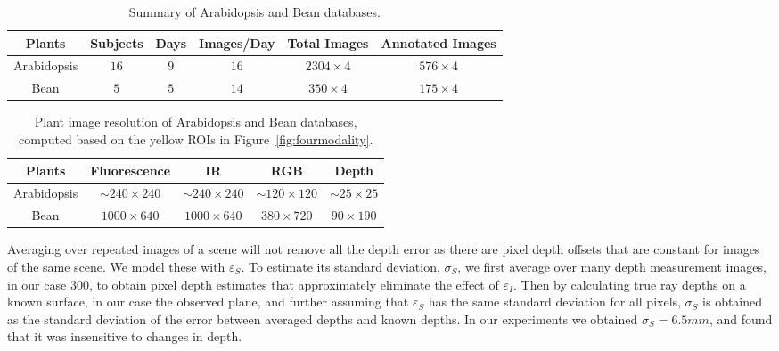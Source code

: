 \begin{table*}[t!]
\begin{center}
\caption{Summary of Arabidopsis and Bean databases.}
\label{tab:stat}
\begin{tabular}{c|c|c|c|c|c}
\hline
Plants & Subjects & Days & Images/Day & Total Images & Annotated Images \\
\hline
Arabidopsis & $16$ & $9$ & $16$ & $2304\times 4$ & $576\times 4$ \\
\hline
Bean & $5$ & $5$ & $14$ & $350\times 4$ & $175\times 4$ \\
\hline
\end{tabular}
\end{center}
\end{table*}



\begin{table*}
\begin{center}
\caption{Plant image resolution of Arabidopsis and Bean databases, computed based on the yellow ROIs in Figure~\ref{fig:fourmodality}.}
\label{tab:resolution}
\begin{tabular}{c|c|c|c|c}
\hline
Plants & Fluorescence & IR & RGB & Depth \\
\hline
Arabidopsis & $\sim$$240\times240$ & $\sim$$240\times240$ & $\sim$$120\times120$ & $\sim$$25\times25$ \\
Bean & $1000\times640$ & $1000\times640$ & $380\times720$ & $90\times190$ \\
\hline
\end{tabular}
\end{center}
\end{table*}

Averaging over repeated images of a scene will not remove all the depth error as there are pixel depth offsets that are constant for images of the same scene. We model these with $\varepsilon_S$. To estimate its standard deviation, $\sigma_S$, we first average over many depth measurement images, in our case 300, to obtain pixel depth estimates that approximately eliminate the effect of $\varepsilon_I$. Then by calculating true ray depths on a known surface, in our case the observed plane, and further assuming that $\varepsilon_S$ has the same standard deviation for all pixels, $\sigma_S$ is obtained as the standard deviation of the error between averaged depths and known depths. In our experiments we obtained $\sigma_S=6.5mm$, and found that it was insensitive to changes in depth.

